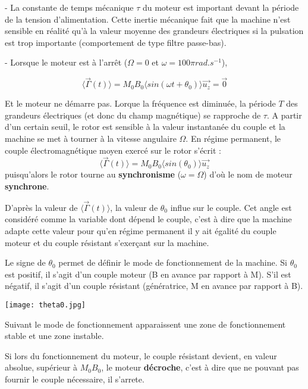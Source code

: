 \documentclass[12pt,prb,aps,epsf]{article}
\begin{document}
- La constante de temps mécanique $\tau$ du moteur est important devant la période de la tension d'alimentation. Cette inertie mécanique fait que la machine n'est sensible en réalité qu'à la valeur moyenne des grandeurs électriques si la pulsation est trop importante (comportement de type filtre passe-bas).\medskip


- Lorsque le moteur est à l'arrêt ($\Omega = 0$ et $\omega = 100 \pi rad.s^{-1}$),

\begin{equation}
    \langle \vec{\Gamma}(t) \rangle = M_0 B_0 \langle sin( \omega t + \theta_0 ) \rangle \vec{u_z} = \vec{0}
\end{equation}

Et le moteur ne démarre pas. Lorque la fréquence est diminuée, la période $T$ des grandeurs électriques (et donc du champ magnétique) se rapproche de $\tau$. A partir d'un certain seuil, le rotor est sensible à la valeur instantanée du couple et la machine se met à tourner à la vitesse angulaire $\Omega$. En régime permanent, le couple électromagnétique moyen exercé sur le rotor s'écrit :
\begin{equation}
    \langle \vec{\Gamma}(t) \rangle = M_0 B_0 \langle sin(\theta_0 ) \rangle \vec{u_z}
\end{equation}
puisqu'alors le rotor tourne au \textbf{synchronisme} ($\omega = \Omega$) d'où le nom de moteur \textbf{synchrone}.\medskip

D'après la valeur de $\langle \vec{\Gamma}(t) \rangle$, la valeur de $\theta_0$ influe sur le couple. Cet angle est considéré comme la variable dont dépend le couple, c'est à dire que la machine adapte cette valeur pour qu'en régime permanent il y ait égalité du couple moteur et du couple résistant s'exerçant sur la machine.\medskip

Le signe de $\theta_0$ permet de définir le mode de fonctionnement de la machine. Si $\theta_0$ est positif, il s'agit d'un couple moteur (B en avance par rapport à M). S'il est négatif, il s'agit d'un couple résistant (génératrice, M en avance par rapport à B).

\begin{center}
    \texttt{[image: theta0.jpg]}
\end{center}

Suivant le mode de fonctionnement apparaissent une zone de fonctionnement stable et une zone instable.\medskip

Si lors du fonctionnement du moteur, le couple résistant devient, en valeur absolue, supérieur à $M_0B_0$, le moteur \textbf{décroche}, c'est à dire que ne pouvant pas fournir le couple nécessaire, il s'arrete.\medskip
\end{document}
